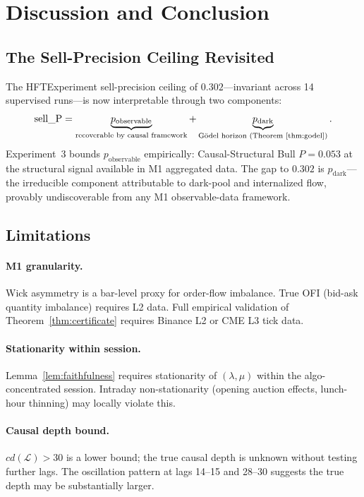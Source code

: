 \documentclass[12pt]{article}
\begin{document}
\section{Discussion and Conclusion}
\label{sec:conclusion}

\subsection{The Sell-Precision Ceiling Revisited}

The HFTExperiment sell-precision ceiling of $0.302$---invariant across
14 supervised runs---is now interpretable through two components:
\begin{equation}
\text{sell\_P}
  = \underbrace{p_{\mathrm{observable}}}_{\text{recoverable by causal framework}}
  + \underbrace{p_{\mathrm{dark}}}_{\text{G\"{o}del horizon (Theorem~\ref{thm:godel})}}.
\end{equation}
Experiment~3 bounds $p_{\mathrm{observable}}$ empirically:
Causal-Structural Bull $P = 0.053$ at the structural signal
available in M1 aggregated data.
The gap to $0.302$ is $p_{\mathrm{dark}}$---the irreducible component
attributable to dark-pool and internalized flow,
provably undiscoverable from any M1 observable-data framework.

\subsection{Limitations}

\paragraph{M1 granularity.}
Wick asymmetry is a bar-level proxy for order-flow imbalance.
True OFI (bid-ask quantity imbalance) requires L2 data.
Full empirical validation of Theorem~\ref{thm:certificate}
requires Binance L2 or CME L3 tick data.

\paragraph{Stationarity within session.}
Lemma~\ref{lem:faithfulness} requires stationarity of
$(\lambda, \mu)$ within the algo-concentrated session.
Intraday non-stationarity (opening auction effects, lunch-hour thinning)
may locally violate this.

\paragraph{Causal depth bound.}
$cd(\mathcal{L}) > 30$ is a lower bound; the true causal depth is
unknown without testing further lags.
The oscillation pattern at lags 14--15 and 28--30 suggests the
true depth may be substantially larger.
\end{document}
